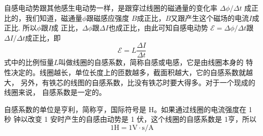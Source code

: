 自感电动势跟其他感生电动势一样，是跟穿过线圈的磁通量的变化率
$\Delta\phi/\Delta t$ 成正比的，我们知道，磁通量$\phi$跟磁感应强度
$B$成正比，$B$又跟产生这个磁场的电流$I$成正比. 所以$\phi$跟$I$成
正比，$\Delta\phi$跟$\Delta I$也成正比，由此可知自感电动势
$\mathcal{E}=\Delta\phi/\Delta t$跟$\Delta I/\Delta t$成正比，即
\begin{equation}
    \mathcal{E}=L\frac{\Delta I}{\Delta t}
\end{equation}
式中的比例恒量$L$叫做线圈的自感系数，简称自感或电感，它是由线圈本身的
特性决定的。线圈越长，单位长度上的匝数越多，截面积越大，它的自感系数就越大，
另外，有铁芯的线图的自感系数，比没有铁芯时要大得多。对于一个现成的线圈来说，
自感系数是一定的。

自感系数的单位是亨利，简称亨，国际符号是 H。如果通过线圈的电流强度在 1 秒
钟以改变 1 安时产生的自感由动势是 1 伏，这个线圈的自感系数是 1亨，所以
\begin{equation}
    1\mathrm H=1\mathrm V\cdot\mathrm s/\mathrm A
\end{equation}